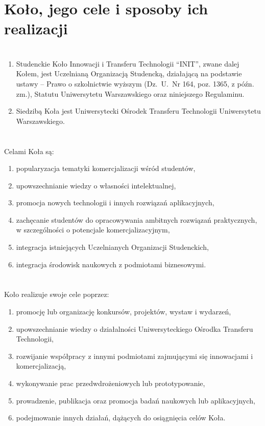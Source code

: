 \section*{Koło, jego cele i sposoby ich realizacji~~}
\section{}
\begin{enumerate}
\item Studenckie Koło Innowacji i Transferu Technologii ``INIT'', zwane dalej Kołem, jest Uczelnianą Organizacją Studencką, działającą na podstawie ustawy --  Prawo o szkolnictwie wyższym  (Dz.~U.~Nr 164, poz. 1365, z późn. zm.), Statutu Uniwersytetu Warszawskiego oraz niniejszego Regulaminu.

\item Siedzibą Koła jest Uniwersytecki Ośrodek Transferu Technologii Uniwersytetu Warszawskiego.
\end{enumerate}

\section{}
Celami Koła są:
\begin{enumerate}[label=\alph*)]
\item popularyzacja tematyki komercjalizacji wśród studentów,
\item upowszechnianie wiedzy o własności intelektualnej,
\item promocja nowych technologii i innych rozwiązań aplikacyjnych,
\item zachęcanie studentów do opracowywania ambitnych rozwiązań praktycznych, w szczególności o potencjale komercjalizacyjnym,
\item integracja istniejących Uczelnianych Organizacji Studenckich,
\item integracja środowisk naukowych z podmiotami biznesowymi.
\end{enumerate}
\section{}

Koło realizuje swoje cele poprzez:
\begin{enumerate}[label=\alph*)]
\item promocję lub organizację konkursów, projektów, wystaw i wydarzeń,
\item upowszechnianie wiedzy o działalności Uniwersyteckiego Ośrodka Transferu Technologii,
\item rozwijanie współpracy z innymi podmiotami zajmującymi się innowacjami i komercjalizacją,
\item wykonywanie prac przedwdrożeniowych lub prototypowanie,
\item prowadzenie, publikacja oraz promocja badań naukowych lub aplikacyjnych,
\item podejmowanie innych działań, dążących do osiągnięcia celów Koła.
\end{enumerate}


